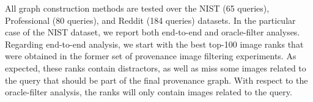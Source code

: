 All graph construction methods are tested over the NIST (65 queries), Professional (80 queries), and Reddit (184 queries) datasets.
In the particular case of the NIST dataset, we report both end-to-end and oracle-filter analyses.
Regarding end-to-end analysis, we start with the best top-100 image ranks that were obtained in the former set of provenance image filtering experiments.
As expected, these ranks contain distractors, as well as miss some images related to the query that should be part of the final provenance graph.
With respect to the oracle-filter analysis, the ranks will only contain images related to the query.
